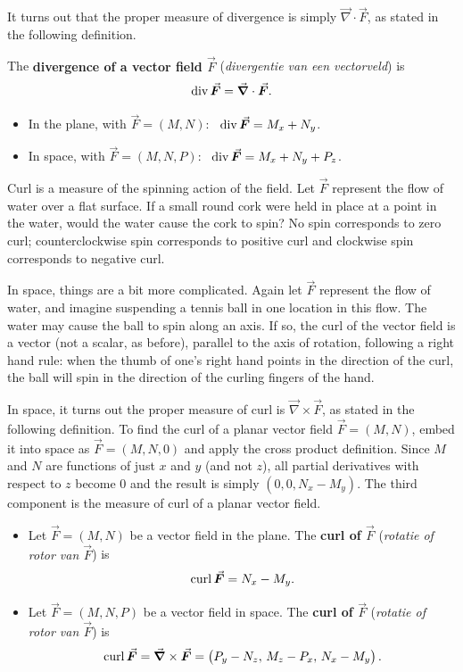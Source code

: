 It turns out that the proper measure of divergence is simply $\vec{\nabla} \cdot \vec F$, as stated in the following definition.

\begin{definition}[Divergence]\label{def:divergence}
The \textbf{divergence of a vector field $\vec F$} (\textit{divergentie van een vectorveld}) is
$$\divv \vec F = \vec{\nabla} \cdot \vec F.$$
\begin{itemize}
	\item In the plane, with $\vec F = \left( M,N\right)$: \  $\divv \vec F = M_x+N_y$.
	\item In space, with $\vec F = \left( M,N,P\right)$: \  $\divv \vec F = M_x+N_y+P_z$.
\end{itemize}
\end{definition}

Curl is a measure of the spinning action of the field. Let $\vec F$ represent the flow of water over a flat surface. If a small round cork were held in place at a point in the water, would the water cause the cork to spin? No spin corresponds to zero curl; counterclockwise spin corresponds to positive curl and clockwise spin corresponds to negative curl. 

In space, things are a bit more complicated. Again let $\vec F$ represent the flow of water, and imagine suspending a tennis ball in one location in this flow. The water may cause the ball to spin along an axis. If so, the curl of the vector field is a vector (not a scalar, as before), parallel to the axis of rotation, following a right hand rule: when the thumb of one's right hand points in the direction of the curl, the ball will spin in the direction of the curling fingers of the hand.

In space, it turns out the proper measure of curl is $\vec{\nabla} \times \vec F$, as stated in the following definition. To find the curl of a planar vector field $\vec F = \left( M,N\right)$, embed it into space as $\vec F = \left( M, N, 0\right)$ and apply the cross product definition. Since $M$ and $N$ are functions of just $x$ and $y$ (and not $z$), all partial derivatives with respect to $z$ become 0 and the result is simply $\left( 0,0,N_x-M_y\right)$. The third component is the measure of curl of a planar vector field. 

\begin{definition}[Curl]\label{def:curl}
\begin{itemize}
	\item Let $\vec F = \left( M,N\right)$ be a vector field in the plane. The \textbf{curl of $\vec F$} (\textit{rotatie of rotor van $\vec F$}) is $$\curl \vec F = N_x - M_y.$$
	\item Let $\vec F = \left( M,N,P\right)$ be a vector field in space. The \textbf{curl of $\vec F$} (\textit{rotatie of rotor van $\vec F$}) is $$\curl \vec F = \vec{\nabla} \times \vec F = \left( P_y-N_z,\,M_z-P_x,\,N_x - M_y\right).$$
\end{itemize}
\end{definition}

